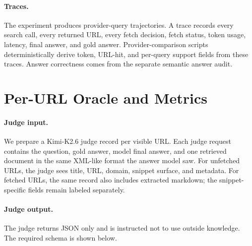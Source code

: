 \paragraph{Traces.}
The experiment produces \NTraces{} provider-query trajectories. A trace records every search call, every returned URL, every fetch decision, fetch status, token usage, latency, final answer, and gold answer. Provider-comparison scripts deterministically derive token, URL-hit, and per-query support fields from these traces. Answer correctness comes from the separate semantic answer audit.

\section{Per-URL Oracle and Metrics}
\label{sec:metrics}

\paragraph{Judge input.}
We prepare a Kimi-K2.6 judge record per visible URL. Each judge request contains the question, gold answer, model final answer, and one retrieved document in the same XML-like format the answer model saw. For unfetched URLs, the judge sees title, URL, domain, snippet surface, and metadata. For fetched URLs, the same record also includes extracted markdown; the snippet-specific fields remain labeled separately.

\paragraph{Judge output.}
The judge returns JSON only and is instructed not to use outside knowledge. The required schema is shown below.

